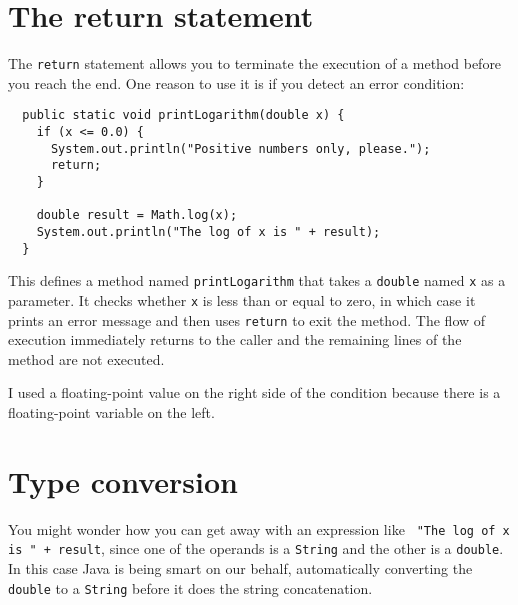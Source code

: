 \documentclass[12pt]{book}
\theoremstyle{definition}
\begin{document}
\section{The return statement}

The {\tt return} statement allows you to terminate the execution
of a method before you reach the end.  One reason to use it
is if you detect an error condition:

\begin{lstlisting}
  public static void printLogarithm(double x) {
    if (x <= 0.0) {
      System.out.println("Positive numbers only, please.");
      return;
    }

    double result = Math.log(x);
    System.out.println("The log of x is " + result);
  }
\end{lstlisting}
%
This defines a method named {\tt printLogarithm} that takes a
{\tt  double} named {\tt x} as a parameter.  It checks whether
{\tt  x} is less than or equal to zero, in which case it prints an error
message and then uses {\tt return} to exit the method.  The flow of
execution immediately returns to the caller and the remaining lines of
the method are not executed.

I used a floating-point value on the right side of the condition
because there is a floating-point variable on the left.


\section {Type conversion}

You might wonder how you can get away with an expression like {\tt
"The log of x is " + result}, since one of the operands is a {\tt String}
and the other is a {\tt double}.  In this case Java is being
smart on our behalf, automatically converting the {\tt double} to a
{\tt String} before it does the string concatenation.


\end{document}
